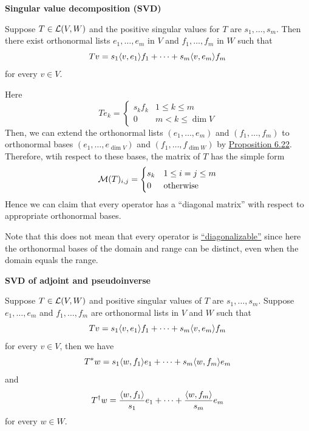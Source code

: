 \documentclass[12pt,a4paper]{article}
\begin{document}
    \begin{prop}
        \textbf{Singular value decomposition (SVD)}

        Suppose $T\in\mathcal{L}(V,W)$ and the positive singular values for $T$ are $s_1,\dots,s_m$. Then there exist orthonormal lists $e_1,\dots,e_m$ in $V$ and $f_1,\dots,f_m$ in $W$ such that
        $$
        Tv=s_1\langle v,e_1\rangle f_1+\cdots+s_m\langle v,e_m\rangle f_m
        $$
        for every $v\in V$.
    \end{prop}
    \begin{remark}
        Here
        $$
        Te_k=\begin{cases}s_kf_k & 1\leq k\leq m\\0 & m<k\leq\dim V\end{cases}
        $$
        Then, we can extend the orthonormal lists $(e_1,\dots,e_m)$ and $(f_1,\dots,f_m)$ to orthonormal bases $(e_1,\dots,e_{\dim V})$ and $(f_1,\dots,f_{\dim W})$ by \hyperref[6.22]{Proposition 6.22}. Therefore, wtih respect to these bases, the matrix of $T$ has the simple form
        $$
        \mathcal{M}(T)_{i,j}=\begin{cases}s_k & 1\leq i=j\leq m\\ 0 & \text{otherwise}\end{cases}
        $$
        Hence we can claim that every operator has a “diagonal matrix” with respect to appropriate orthonormal bases.
    \end{remark}
    \begin{remark}
        Note that this does not mean that every operator is \hyperref[5.35]{“diagonalizable”} since here the orthonormal bases of the domain and range can be distinct, even when the domain equals the range.
    \end{remark}
    \hfill

    \begin{prop}
        \textbf{SVD of adjoint and pseudoinverse}

        Suppose $T\in\mathcal{L}(V,W)$ and positive singular values of $T$ are $s_1,\dots,s_m$. Suppose $e_1,\dots,e_m$ and $f_1,\dots,f_m$ are orthonormal lists in $V$ and $W$ such that
        $$
        Tv=s_1\langle v,e_1\rangle f_1+\cdots+s_m\langle v,e_m\rangle f_m
        $$
        for every $v\in V$, then we have
        $$
        T^*w=s_1\langle w,f_1\rangle e_1+\cdots+s_m\langle w,f_m\rangle e_m
        $$
        and
        $$
        T^\dagger w=\frac{\langle w,f_1\rangle}{s_1}e_1+\cdots+\frac{\langle w,f_m\rangle}{s_m}e_m
        $$
        for every $w\in W$.
    \end{prop}
    \hfill
\end{document}
